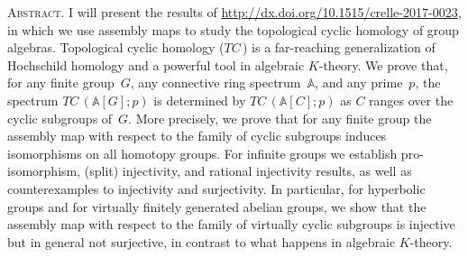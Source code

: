 \documentclass[12pt]{article}
\begin{document}
\noindent\small\textsc{Abstract.}
I will present the results of \url{http://dx.doi.org/10.1515/crelle-2017-0023}, in which we use assembly maps to study the topological cyclic homology of group algebras. Topological cyclic homology ($\mathit{TC}\,$) is a far-reaching generalization of Hochschild homology and a powerful tool in algebraic $K$-theory. We prove that, for any finite group~$G$, any connective ring spectrum~$\mathbb{A}$, and any prime~$p$, the spectrum $\mathit{TC}\,(\mathbb{A}[G];p)$ is determined by $\mathit{TC}\,(\mathbb{A}[C];p)$ as $C$ ranges over the cyclic subgroups of~$G$. More precisely, we prove that for any finite group the assembly map with respect to the family of cyclic subgroups induces isomorphisms on all homotopy groups. For infinite groups we establish pro-isomorphism, (split) injectivity, and rational injectivity results, as well as counterexamples to injectivity and surjectivity. In particular, for hyperbolic groups and for virtually finitely generated abelian groups, we show that the assembly map with respect to the family of virtually cyclic subgroups is injective but in general not surjective, in contrast to what happens in algebraic $K$-theory.
\end{document}
